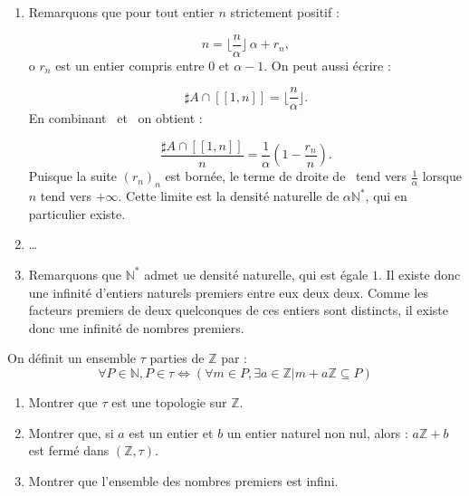 \begin{sol}
\begin{enumerate}
\item Remarquons que pour tout entier \(n\) strictement positif :

\begin{equation}
n=\lfloor \frac{n}{\alpha} \rfloor \, \alpha + r_n ,
\label{eq:div_alpha_n}
\end{equation}
o \(r_n\) est un entier compris entre \(0\) et \(\alpha-1\). %
On peut aussi \'ecrire :

\begin{equation}
\sharp A \cap [\![1,n]\!] = \lfloor \frac{n}{\alpha} \rfloor.
\label{eq:card_n_sur_alpha}
\end{equation}
En combinant~ et~ on obtient :

\begin{equation}
\dfrac{\sharp A \cap [\![1,n]\!]}{n} = \dfrac{1}{\alpha}\left(1-\frac{r_n}{n}\right) .
\label{eq:dens_n_rn}
\end{equation}
Puisque la suite \((r_n)_n\) est born\'ee, le terme de droite de~ tend vers \(\frac{1}{\alpha}\) lorsque \(n\) tend vers \(+\infty\). %
Cette limite est la densit\'e naturelle de \(\alpha\mathbb{N}^{\ast}\), qui en particulier existe.
\item \dots
\item Remarquons que \(\mathbb{N}^{\ast}\) admet ue densit\'e naturelle, qui est \'egale  \(1\). %
Il existe donc une infinit\'e d'entiers naturels premiers entre eux deux  deux. %
Comme les facteurs premiers de deux quelconques de ces entiers sont distincts, il existe donc une infinit\'e de nombres premiers.
\end{enumerate}
\end{sol}

\begin{exer}
On définit un ensemble $\tau$ parties de $\mathbb{Z}$ par :
\[\forall P \in \mathbb{N} , P \in \tau \Leftrightarrow ( \forall m \in P , \exists a \in \mathbb{Z} | m + a \mathbb{Z} \subseteq P)\]
\begin{enumerate}
\item Montrer que $\tau$ est une topologie sur $\mathbb{Z}$.
\item Montrer que, si $a$ est un entier et $b$ un entier naturel non nul, alors : %
$a \mathbb{Z} + b$ est fermé dans $(\mathbb{Z} , \tau)$.
\item Montrer que l'ensemble des nombres premiers est infini.
\end{enumerate}
\end{exer}

